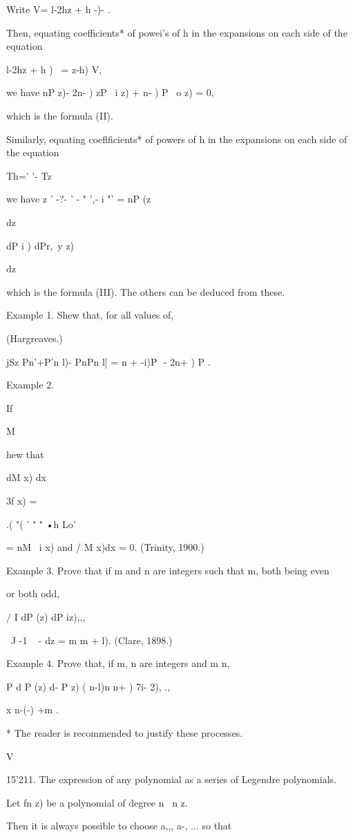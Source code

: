 {Write V= l-2hz + h -)- .

Then, equating coefficients* of powei's of h in the expansions on each
side of the equation

 l-2hz + h )~ = z-h) V,

we have nP z)- 2n- ) zP \ i z) + n- ) P \ o z) = 0,

which is the formula (II).

Similarly, equating coeflficients* of powers of h in the expansions on
each side of the equation

 Th=' '- Tz

we have z ' -?- ' - " ',- i "' = nP (z\

dz

dP i ) dPr,\ y z)

dz

which is the formula (III). The others can be deduced from these.

Example 1. Shew that, for all values of,

(Hargreaves.)

jSz Pn'+P'n l)- PnPn l] = n + -i)P\ \,- 2n+ ) P .

Example 2.

If

M

hew that

dM x) dx

3f x) =

.( "( ' " " •h Lo'

= nM \ i x) and / M x)dx = 0. (Trinity, 1900.)

Example 3. Prove that if m and n are integers such that m, both being
even

or both odd,

/ I dP (z) dP iz),,,

\ J -1 ~ - dz = m m + l). (Clare, 1898.)

Example 4. Prove that, if m, n are integers and m n,

P d P (z) d- P z) ( n-l)n n+ ) 7i- 2), .,

x n-(-) +m .

 * The reader is recommended to justify these
processes.

V

%
%

15'211. The expression of any polynomial as a series of Legendre
polynomials.

Let fn z) be a polynomial of degree n \ n z.

Then it is always possible to choose a,,, a-, ... so that

}
